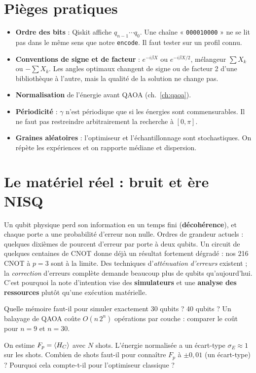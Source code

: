 \section{Pièges pratiques}\label{sec:pieges-outils}
\begin{itemize}
\item \textbf{Ordre des bits} : Qiskit affiche $q_{n-1}\cdots q_0$. Une chaîne « \texttt{000010000} » ne se lit pas dans le même sens que notre \texttt{encode}. Il faut tester sur un profil connu.
\item \textbf{Conventions de signe et de facteur} : $e^{-i\beta X}$ ou $e^{-i\beta X/2}$, mélangeur $\sum X_k$ ou $-\sum X_k$. Les angles optimaux changent de signe ou de facteur 2 d'une bibliothèque à l'autre, mais la qualité de la solution ne change pas.
\item \textbf{Normalisation} de l'énergie avant QAOA (ch.~\ref{ch:qaoa}).
\item \textbf{Périodicité} : $\gamma$ n'est périodique que si les énergies sont commensurables. Il ne faut pas restreindre arbitrairement la recherche à $[0,\pi]$.
\item \textbf{Graines aléatoires} : l'optimiseur et l'échantillonnage sont stochastiques. On répète les expériences et on rapporte médiane et dispersion.
\end{itemize}

\section{Le matériel réel : bruit et ère NISQ}
Un qubit physique perd son information en un temps fini (\textbf{décohérence}), et chaque porte a une probabilité d'erreur non nulle. Ordres de grandeur actuels : quelques dixièmes de pourcent d'erreur par porte à deux qubits. Un circuit de quelques centaines de CNOT donne déjà un résultat fortement dégradé : nos 216 CNOT à $p=3$ sont à la limite. Des techniques d'\emph{atténuation d'erreurs} existent ; la \emph{correction} d'erreurs complète demande beaucoup plus de qubits qu'aujourd'hui. C'est pourquoi la note d'intention vise des \textbf{simulateurs} et une \textbf{analyse des ressources} plutôt qu'une exécution matérielle.

\exercices
\begin{exercice}
Quelle mémoire faut-il pour simuler exactement 30 qubits ? 40 qubits ? Un balayage de QAOA coûte $O(n\,2^n)$ opérations par couche : comparer le coût pour $n=9$ et $n=30$.
\end{exercice}
\begin{exercice}
On estime $F_p=\langle H_C\rangle$ avec $N$ shots. L'énergie normalisée a un écart-type $\sigma_E\approx1$ sur les shots. Combien de shots faut-il pour connaître $F_p$ à $\pm0{,}01$ (un écart-type) ? Pourquoi cela compte-t-il pour l'optimiseur classique ?
\end{exercice}
